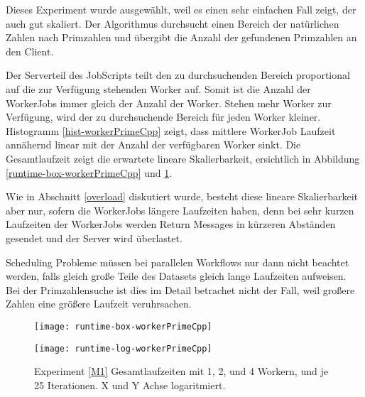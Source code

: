 Dieses Experiment wurde ausgewählt, weil es einen sehr einfachen Fall zeigt, der auch gut skaliert.
Der Algorithmus durchsucht einen Bereich der natürlichen Zahlen nach Primzahlen und übergibt die Anzahl der gefundenen Primzahlen an den Client.

Der Serverteil des JobScripts teilt den zu durchsuchenden Bereich proportional auf die zur Verfügung stehenden Worker auf.
Somit ist die Anzahl der WorkerJobs immer gleich der Anzahl der Worker.
Stehen mehr Worker zur Verfügung, wird der zu durchsuchende Bereich für jeden Worker kleiner.
Histogramm \ref{hist-workerPrimeCpp} zeigt, dass mittlere WorkerJob Laufzeit annähernd linear mit der Anzahl der verfügbaren Worker sinkt.
Die Gesamtlaufzeit zeigt die erwartete lineare Skalierbarkeit, ersichtlich in Abbildung \ref{runtime-box-workerPrimeCpp} und \ref{runtime-log-workerPrimeCpp}.

Wie in Abschnitt \ref{overload} diskutiert wurde, besteht diese lineare Skalierbarkeit aber nur, sofern die WorkerJobs längere Laufzeiten haben, denn bei sehr kurzen Laufzeiten der WorkerJobs werden Return Messages in kürzeren Abständen gesendet und der Server wird überlastet.

Scheduling Probleme müssen bei parallelen Workflows nur dann nicht beachtet werden, falls gleich große Teile des Datasets gleich lange Laufzeiten aufweisen. Bei der Primzahlensuche ist dies im Detail betrachet nicht der Fall, weil großere Zahlen eine größere Laufzeit veruhrsachen.


\vspace{50mm}

\begin{figure}[H]
  \centering
  \begin{minipage}[b]{0.45\textwidth}
    \texttt{[image: runtime-box-workerPrimeCpp]}
    \caption{Experiment \ref{M1}. Boxplots für Gesamtlaufzeit mit 1, 2, und 4 Worker, und je 25 Iterationen}
    \label{runtime-box-workerPrimeCpp}
  \end{minipage}
  \hfill
  \begin{minipage}[b]{0.45\textwidth}
    \texttt{[image: runtime-log-workerPrimeCpp]}
    \caption{Experiment \ref{M1} Gesamtlaufzeiten mit 1, 2, und 4 Workern, und je 25 Iterationen. X und Y Achse logaritmiert.}
    \label{runtime-log-workerPrimeCpp}
  \end{minipage}
\end{figure}






